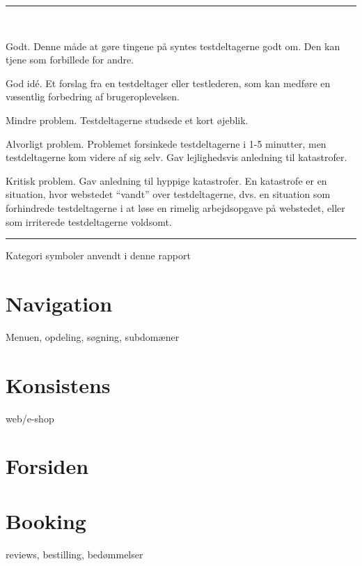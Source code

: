 \documentclass[10pt,a4paper]{article}      %
\newcommand\pic[1]{\texttt{[image: Pics/\#1]}}
\renewcommand\good{\pic{good}}
\renewcommand\goodidea{\pic{goodidea}}
\renewcommand\smallproblem{\pic{smallproblem}}
\renewcommand\seriousproblem{\pic{seriousproblem}}
\renewcommand\criticalproblem{\pic{criticalproblem}}
\begin{document}
\begin{table}[!ht]
\centering
\rule{\linewidth}{\heavyrulewidth}\\[6mm]
\begin{kommentarer}

\item[\good] Godt. Denne måde at gøre tingene på syntes testdeltagerne godt om.
Den kan tjene som forbillede for andre.

\item[\goodidea] God idé. Et forslag fra en testdeltager eller testlederen, som
kan medføre en væsentlig forbedring af brugeroplevelsen.

\item[\smallproblem] Mindre problem. Testdeltagerne studsede et kort øjeblik.

\item[\seriousproblem] Alvorligt problem. Problemet forsinkede testdeltagerne i 1-5
minutter, men testdeltagerne kom videre af sig selv. Gav lejlighedsvis
anledning til katastrofer.

\item[\criticalproblem] Kritisk problem. Gav anledning til hyppige katastrofer. En
katastrofe er en situation, hvor webstedet ``vandt'' over testdeltagerne, dvs.
en situation som forhindrede testdeltagerne i at løse en rimelig arbejdsopgave
på webstedet, eller som irriterede testdeltagerne voldsomt.

\end{kommentarer}
\rule{\linewidth}{\heavyrulewidth}
\caption{Kategori symboler anvendt i denne rapport}
\label{tab:gt}
\end{table}%
\clearpage


\section{Navigation}
Menuen, opdeling, søgning, subdomæner

\section{Konsistens}
web/e-shop

\section{Forsiden}

\section{Booking}
reviews, bestilling, bedømmelser
\end{document}
